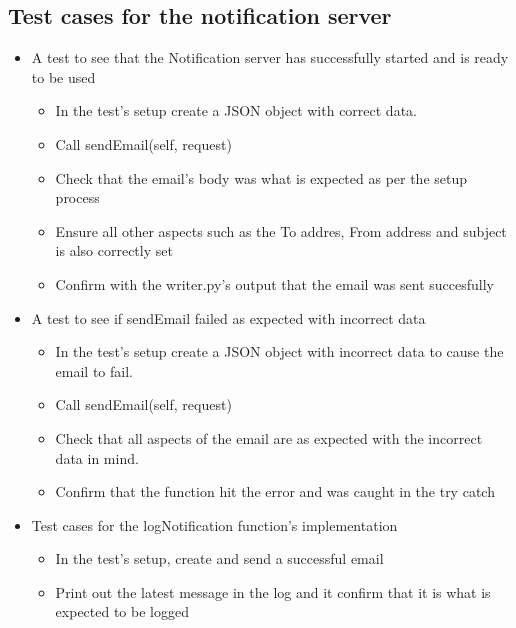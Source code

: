 \documentclass[11pt]{article}
\begin{document}
	\subsection{Test cases for the notification server}
		\begin{itemize}
			\item A test to see that the Notification server has successfully started and is ready to be used
				\begin{itemize}
					\item In the test's setup create a JSON object with correct data.
					\item Call sendEmail(self, request) 
					\item Check that the email's body was what is expected as per the setup process
					\item Ensure all other aspects such as the To addres, From address and subject is also correctly set
					\item Confirm with the writer.py's output that the email was sent succesfully
				\end{itemize}
			\item A test to see if sendEmail failed as expected with incorrect data 	
				\begin{itemize}
					\item In the test's setup create a JSON object with incorrect data to cause the email to fail.
					\item Call sendEmail(self, request) 
					\item Check that all aspects of the email are as expected with the incorrect data in mind.
					\item Confirm that the function hit the error and was caught in the try catch
				\end{itemize}
			\item Test cases for the logNotification function's implementation
				\begin{itemize}
					\item In the test's setup, create and send a successful email
					\item Print out the latest message in the log and it confirm that it is what is expected to be logged
				\end{itemize}
		\end{itemize}
\end{document}
